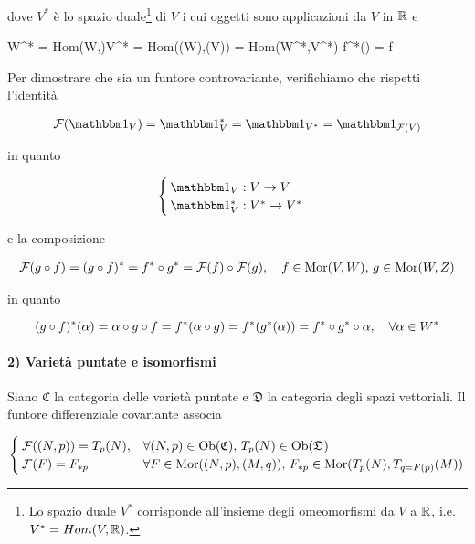 dove $ V^{*} $ è lo spazio duale\footnote{%
	Lo spazio duale $ V^{*} $ corrisponde all'insieme degli omeomorfismi da $ V $ a $ \mathbb{R} $, i.e. $ V^{*} = Hom(V,\mathbb{R}) $.%
} di $ V $ i cui oggetti sono applicazioni da $ V $ in $ \mathbb{R} $ e

	{W^{*} = Hom(W,\R)}{V^{*} = Hom((W),(V)) = Hom(W^{*},V^{*})}
	{\alpha}{f^{*}(\alpha) = \alpha \circ f}

Per dimostrare che sia un funtore controvariante, verifichiamo che rispetti l'identità

\begin{align}
	\mathcal{F}(\bigone_{V}) = \bigone_{V}^{*} %
	= \bigone_{V^{*}} %
	= \bigone_{\mathcal{F}(V)}
\end{align}

in quanto

\begin{equation}
	\begin{cases}
		\bigone_{V} : V \to V \\
		\bigone_{V}^{*} : V^{*} \to V^{*}
	\end{cases}
\end{equation}

e la composizione

\begin{align}
	\mathcal{F}(g \circ f) = (g \circ f)^{*} %
	= f^{*} \circ g^{*} %
	= \mathcal{F}(f) \circ \mathcal{F}(g) %
	\qcomma f \in \mor(V,W), \, g \in \mor(W,Z)
\end{align}

in quanto

\begin{equation}
	(g \circ f)^{*}(\alpha) = \alpha \circ g \circ f %
	= f^{*} (\alpha \circ g) %
	= f^{*} (g^{*}(\alpha)) %
	= f^{*} \circ g^{*} \circ \alpha %
	\qcomma \forall \alpha \in W^{*}
\end{equation}

\paragraph{2) Varietà puntate e isomorfismi}

Siano $ \mathfrak{C} $ la categoria delle varietà puntate e $ \mathfrak{D} $ la categoria degli spazi vettoriali. Il funtore differenziale covariante associa

\begin{equation}
	\begin{cases}
		\mathcal{F}((N,p)) = T_{p}(N), & \forall (N,p) \in \operatorname{Ob}(\mathfrak{C}), \, T_{p}(N) \in \operatorname{Ob}(\mathfrak{D}) \\
		\mathcal{F}(F) = F_{*p} & \forall F \in \operatorname{Mor}((N,p),(M,q)), \, F_{*p} \in \operatorname{Mor}(T_{p}(N),T_{q=F(p)}(M))
	\end{cases}
\end{equation}

